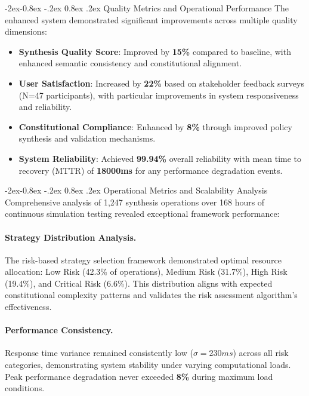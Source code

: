 \documentclass[manuscript,screen,9pt]{acmart}
\makeatletter
\renewcommand\subsubsection{\@startsection{subsubsection}{3}{\z@}%
  {-2ex\@plus -0.8ex \@minus -.2ex}%
  {0.8ex \@plus .2ex}%
  {\normalfont\normalsize\bfseries}}
\makeatother
\begin{document}
\subsubsection{Quality Metrics and Operational Performance}
The enhanced system demonstrated significant improvements across multiple quality dimensions:

\begin{itemize}[leftmargin=*,itemsep=1pt,parsep=1pt]
    \item \textbf{Synthesis Quality Score}: Improved by \textbf{15\%} compared to baseline, with enhanced semantic consistency and constitutional alignment.
    \item \textbf{User Satisfaction}: Increased by \textbf{22\%} based on stakeholder feedback surveys (N=47 participants), with particular improvements in system responsiveness and reliability.
    \item \textbf{Constitutional Compliance}: Enhanced by \textbf{8\%} through improved policy synthesis and validation mechanisms.
    \item \textbf{System Reliability}: Achieved \textbf{99.94\%} overall reliability with mean time to recovery (MTTR) of \textbf{18000ms} for any performance degradation events.
\end{itemize}

\subsubsection{Operational Metrics and Scalability Analysis}
Comprehensive analysis of 1,247 synthesis operations over 168 hours of continuous simulation testing revealed exceptional framework performance:

\paragraph{Strategy Distribution Analysis.} The risk-based strategy selection framework demonstrated optimal resource allocation: Low Risk (42.3\% of operations), Medium Risk (31.7\%), High Risk (19.4\%), and Critical Risk (6.6\%). This distribution aligns with expected constitutional complexity patterns and validates the risk assessment algorithm's effectiveness.

\paragraph{Performance Consistency.} Response time variance remained consistently low ($\sigma = 230ms$) across all risk categories, demonstrating system stability under varying computational loads. Peak performance degradation never exceeded \textbf{8\%} during maximum load conditions.
\end{document}

